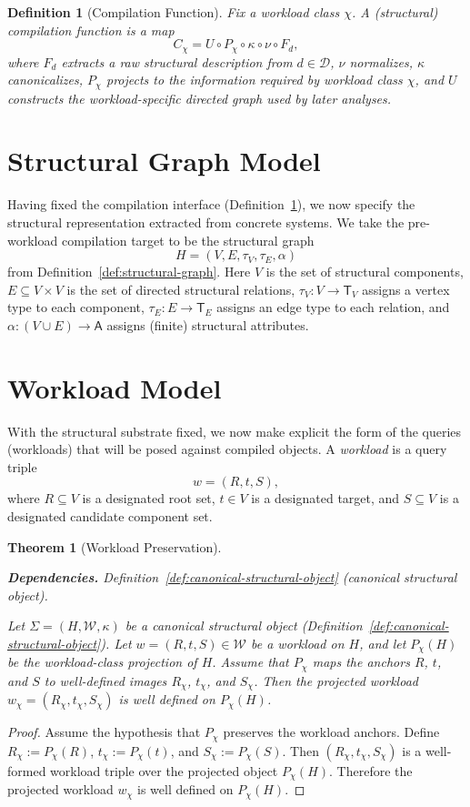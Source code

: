 \documentclass[11pt]{article}
\newtheorem{definition}{Definition}
\newtheorem{theorem}{Theorem}
\newcommand{\deps}[1]{\par\noindent\textbf{Dependencies.} #1\par}
\begin{document}
\begin{definition}[Compilation Function]
\label{def:compilation-function}
Fix a workload class $\chi$. A \emph{(structural) compilation function} is a map
\[
C_\chi = U\circ P_\chi\circ\kappa\circ\nu\circ F_d,
\]
where $F_d$ extracts a raw structural description from $d\in\mathcal{D}$, $\nu$ normalizes, $\kappa$ canonicalizes, $P_\chi$ projects to the information required by workload class $\chi$, and $U$ constructs the workload-specific directed graph used by later analyses.
\end{definition}

\section{Structural Graph Model}
\label{sec:structural-graph-model}
Having fixed the compilation interface (Definition~\ref{def:compilation-function}), we now specify the structural representation extracted from concrete systems.
We take the pre-workload compilation target to be the structural graph
\[
H=(V,E,\tau_V,\tau_E,\alpha)
\]
from Definition~\ref{def:structural-graph}. Here $V$ is the set of structural components, $E\subseteq V\times V$ is the set of directed structural relations, $\tau_V:V\to\mathsf{T}_V$ assigns a vertex type to each component, $\tau_E:E\to\mathsf{T}_E$ assigns an edge type to each relation, and $\alpha:(V\cup E)\to\mathsf{A}$ assigns (finite) structural attributes.

\section{Workload Model}
\label{sec:workload-model}
With the structural substrate fixed, we now make explicit the form of the queries (workloads) that will be posed against compiled objects.
A \emph{workload} is a query triple
\[
w=(R,t,S),
\]
where $R\subseteq V$ is a designated root set, $t\in V$ is a designated target, and $S\subseteq V$ is a designated candidate component set.

\begin{theorem}[Workload Preservation]
\label{thm:workload-preservation}
\deps{Definition~\ref{def:canonical-structural-object} (canonical structural object).}
Let $\Sigma=(H,\mathcal W,\kappa)$ be a canonical structural object (Definition~\ref{def:canonical-structural-object}).
Let $w=(R,t,S)\in\mathcal W$ be a workload on $H$, and let $P_\chi(H)$ be the workload-class projection of $H$.
Assume that $P_\chi$ maps the anchors $R$, $t$, and $S$ to well-defined images $R_\chi$, $t_\chi$, and $S_\chi$.
Then the projected workload $w_\chi=(R_\chi,t_\chi,S_\chi)$ is well defined on $P_\chi(H)$.
\end{theorem}
\begin{proof}
Assume the hypothesis that $P_\chi$ preserves the workload anchors.
Define $R_\chi:=P_\chi(R)$, $t_\chi:=P_\chi(t)$, and $S_\chi:=P_\chi(S)$.
Then $(R_\chi,t_\chi,S_\chi)$ is a well-formed workload triple over the projected object $P_\chi(H)$.
Therefore the projected workload $w_\chi$ is well defined on $P_\chi(H)$.
\end{proof}
\end{document}
